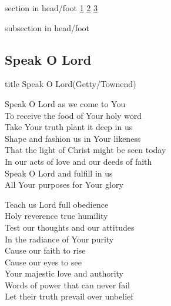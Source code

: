 \documentclass{beamer}
\begin{document}
{
{ 
 {
 \begin{beamercolorbox}[ht=4.5ex,dp=1.5ex,%
      leftskip=.3cm,rightskip=.3cm plus1fil]{section in head/foot}
 \fontsize{12}{25}\selectfont 
\hyperlink{Speak O Lord[](Getty/Townend)1}{1}
\hyperlink{Speak O Lord[](Getty/Townend)2}{2}
\hyperlink{Speak O Lord[](Getty/Townend)3}{3}
 
 \end{beamercolorbox}%
  \begin{beamercolorbox}[ht=2.5ex,dp=1.125ex,%
   leftskip=.3cm,rightskip=.3cm plus1fil]{subsection in head/foot}
   \insertauthor
 \end{beamercolorbox}%
 }
}
\subsection{ Speak O Lord }

\hypertarget{Speak O Lord[](Getty/Townend)}{}
\begin{frame}{}
 \vfill
  \centering
  \begin{beamercolorbox}[sep=8pt,center,shadow=true,rounded=true]{title}
    Speak O Lord(Getty/Townend)    
  \end{beamercolorbox}
  \vfill
\end{frame}

\hypertarget{Speak O Lord[](Getty/Townend)1}{}
\begin{frame}{}
\fontsize{ 15 }{ 19 }\selectfont

Speak O Lord as we come to You\\ 
To receive the food of Your holy word\\ 
Take Your truth plant it deep in us\\ 
Shape and fashion us in Your likeness\\ 
That the light of Christ might be seen today\\ 
In our acts of love and our deeds of faith\\ 
Speak O Lord and fulfill in us\\ 
All Your purposes for Your glory 

\end{frame}

\hypertarget{Speak O Lord[](Getty/Townend)2}{}
\begin{frame}{}
\fontsize{ 15 }{ 19 }\selectfont

Teach us Lord full obedience\\ 
Holy reverence true humility\\ 
Test our thoughts and our attitudes\\ 
In the radiance of Your purity\\ 
Cause our faith to rise\\ 
Cause our eyes to see\\ 
Your majestic love and authority\\ 
Words of power that can never fail\\ 
Let their truth prevail over unbelief 


\end{frame}}
\end{document}
